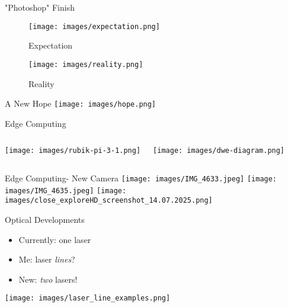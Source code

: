 \begin{frame}{"Photoshop" Finish}
    \centering
    \begin{figure}
        \texttt{[image: images/expectation.png]}
        \caption{Expectation}

        \vspace{1em}

        \texttt{[image: images/reality.png]}
        \caption{Reality}
        
    \end{figure}
\end{frame}

\begin{frame}{A New Hope}
    \hspace*{0.025\textwidth}  %
    \texttt{[image: images/hope.png]}
\end{frame}

\begin{frame}{Edge Computing}
    \begin{columns}
        \centering
        \texttt{[image: images/rubik-pi-3-1.png]}
        
        \centering
        \texttt{[image: images/dwe-diagram.png]}
    \end{columns}
\end{frame}

\begin{frame}{Edge Computing- New Camera}
    \centering
    \texttt{[image: images/IMG\_4633.jpeg]}
    \texttt{[image: images/IMG\_4635.jpeg]}
    \texttt{[image: images/close\_exploreHD\_screenshot\_14.07.2025.png]}
\end{frame}

\begin{frame}{Optical Developments}
    \centering
    \begin{itemize}
        \item Currently: one laser
        \item Me: laser \textit{lines}?
        \item New: \textit{two} lasers!
    \end{itemize}
    \texttt{[image: images/laser\_line\_examples.png]}
\end{frame}